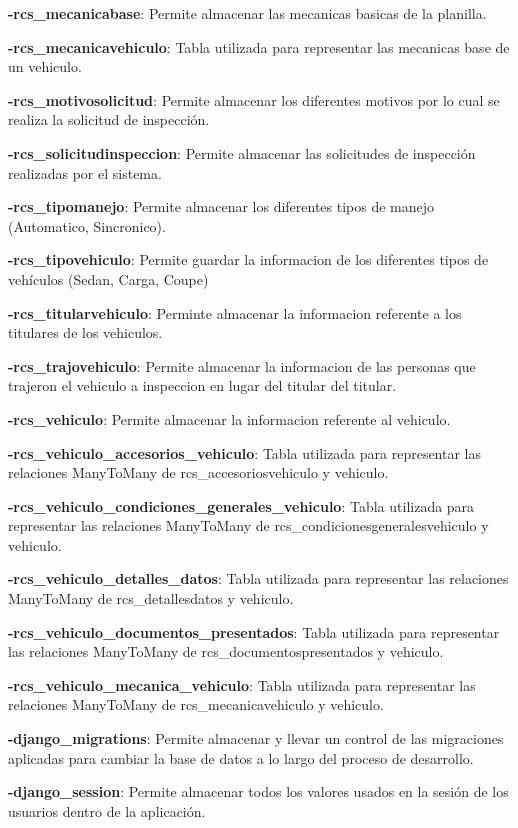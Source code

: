 \textbf{-rcs\_mecanicabase}: Permite almacenar las mecanicas basicas de la planilla.

\textbf{-rcs\_mecanicavehiculo}: Tabla utilizada para representar las mecanicas base de un vehiculo.

\textbf{-rcs\_motivosolicitud}: Permite almacenar los diferentes motivos por lo cual se realiza la solicitud de inspección.

\textbf{-rcs\_solicitudinspeccion}: Permite almacenar las solicitudes de inspección realizadas por el sistema.

\textbf{-rcs\_tipomanejo}: Permite almacenar los diferentes tipos de manejo (Automatico, Sincronico).

\textbf{-rcs\_tipovehiculo}: Permite guardar la informacion de los diferentes tipos de vehículos (Sedan, Carga, Coupe)

\textbf{-rcs\_titularvehiculo}: Perminte almacenar la informacion referente a los titulares de los vehiculos.

\textbf{-rcs\_trajovehiculo}: Permite almacenar la informacion de las personas que trajeron el vehiculo a inspeccion en lugar del titular del titular.

\textbf{-rcs\_vehiculo}: Permite almacenar la informacion referente al vehiculo.

\textbf{-rcs\_vehiculo\_accesorios\_vehiculo}: Tabla utilizada para representar las relaciones ManyToMany de rcs\_accesoriosvehiculo y vehiculo.

\textbf{-rcs\_vehiculo\_condiciones\_generales\_vehiculo}: Tabla utilizada para representar las relaciones ManyToMany de rcs\_condicionesgeneralesvehiculo y vehiculo.

\textbf{-rcs\_vehiculo\_detalles\_datos}: Tabla utilizada para representar las relaciones ManyToMany de rcs\_detallesdatos y vehiculo.

\textbf{-rcs\_vehiculo\_documentos\_presentados}: Tabla utilizada para representar las relaciones ManyToMany de rcs\_documentospresentados y vehiculo.

\textbf{-rcs\_vehiculo\_mecanica\_vehiculo}: Tabla utilizada para representar las relaciones ManyToMany de rcs\_mecanicavehiculo y vehiculo.

\textbf{-django\_migrations}: Permite almacenar y llevar un control de las
migraciones aplicadas para cambiar la base de datos a lo largo del proceso de
desarrollo.

\textbf{-django\_session}: Permite almacenar todos los valores usados en la sesión
de los usuarios dentro de la aplicación.


